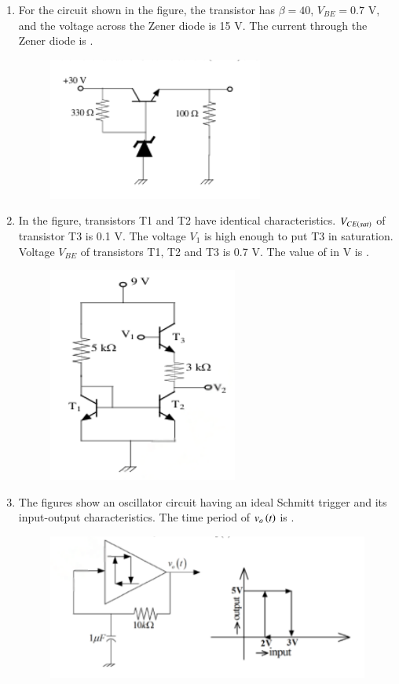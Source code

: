 \documentclass[journal,12pt,onecolumn]{IEEEtran}
\theoremstyle{remark}
\begin{document}
\begin{enumerate}
    \item For the circuit shown in the figure, the transistor has $\beta = 40$, $V_{BE} = 0.7$ V, and the voltage across the Zener diode is 15 V. The current  through the Zener diode is \underline{\hspace{2cm}}.
    \begin{figure}[H]
        \centering
        \includegraphics[width=0.4\columnwidth]{q38}
        \caption*{}
        \label{Q38}
    \end{figure}

    \hfill{}

    \item In the figure, transistors T1 and T2 have identical characteristics. $V_{CE\left(sat\right)}$ of transistor T3 is 0.1 V. The voltage $V_1$ is high enough to put T3 in saturation. Voltage $V_{BE}$ of transistors T1, T2 and T3 is 0.7 V. The value of  in V is \underline{\hspace{2cm}}.
    \begin{figure}[H]
        \centering
        \includegraphics[width=0.4\columnwidth]{q39}
        \caption*{}
        \label{Q39}
    \end{figure}

    \hfill{}

    \item The figures show an oscillator circuit having an ideal Schmitt trigger and its input-output characteristics. The time period  of $v_o\left(t\right)$ is \underline{\hspace{2cm}}.
    \begin{figure}[H]
        \centering
        \includegraphics[width=0.55\columnwidth]{q40}
        \caption*{}
        \label{Q40}
    \end{figure}


\end{enumerate}
\end{document}
